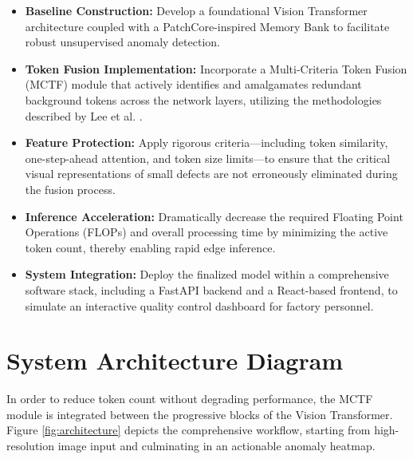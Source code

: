 \documentclass[12pt]{article}
\begin{document}
\begin{itemize}
    \item \textbf{Baseline Construction:} Develop a foundational Vision Transformer architecture coupled with a PatchCore-inspired Memory Bank to facilitate robust unsupervised anomaly detection.
    \item \textbf{Token Fusion Implementation:} Incorporate a Multi-Criteria Token Fusion (MCTF) module that actively identifies and amalgamates redundant background tokens across the network layers, utilizing the methodologies described by Lee et al. \cite{lee2023multi}.
    \item \textbf{Feature Protection:} Apply rigorous criteria---including token similarity, one-step-ahead attention, and token size limits---to ensure that the critical visual representations of small defects are not erroneously eliminated during the fusion process.
    \item \textbf{Inference Acceleration:} Dramatically decrease the required Floating Point Operations (FLOPs) and overall processing time by minimizing the active token count, thereby enabling rapid edge inference.
    \item \textbf{System Integration:} Deploy the finalized model within a comprehensive software stack, including a FastAPI backend and a React-based frontend, to simulate an interactive quality control dashboard for factory personnel.
\end{itemize}

\section{System Architecture Diagram}
In order to reduce token count without degrading performance, the MCTF module is integrated between the progressive blocks of the Vision Transformer. Figure \ref{fig:architecture} depicts the comprehensive workflow, starting from high-resolution image input and culminating in an actionable anomaly heatmap.
\end{document}
